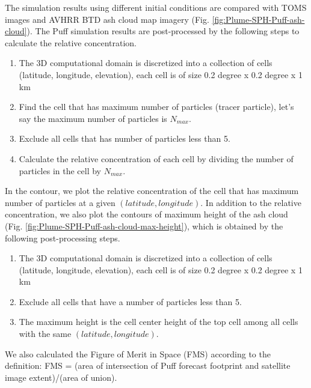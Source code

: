 \documentclass[utf8]{frontiersSCNS} %
\begin{document}
The simulation results using different initial conditions are compared with TOMS images and AVHRR BTD ash cloud map imagery (Fig. \ref{fig:Plume-SPH-Puff-ash-cloud}). The Puff simulation results are post-processed by the following steps to calculate the relative concentration.
\begin{enumerate}
\item The 3D computational domain is discretized into a collection of cells (latitude, longitude, elevation), each cell is of size 0.2 degree x 0.2 degree x 1 km
\item  Find the cell that has maximum number of particles (tracer particle), let's say the maximum number of particles is $N_{max}$.
\item Exclude all cells that has number of particles less than 5.
\item Calculate the relative concentration of each cell by dividing the number of particles in the cell by $N_{max}$.
\end{enumerate}
In the contour, we plot the relative concentration of the cell that has maximum number of particles at a given $(latitude, longitude)$.
In addition to the relative concentration, we also plot the contours of maximum height of the ash cloud (Fig. \ref{fig:Plume-SPH-Puff-ash-cloud-max-height}), which is obtained by the following post-processing steps.
\begin{enumerate}
\item The 3D computational domain is discretized into a collection of cells (latitude, longitude, elevation), each cell is of size 0.2 degree x 0.2 degree x 1 km
\item Exclude all cells that have a number of particles less than 5.
\item The maximum height is the cell center height of the top cell among all cells with the same $(latitude, longitude)$.
\end{enumerate}
We also calculated the Figure of Merit in Space (FMS) according to the definition: FMS = (area of intersection of Puff forecast footprint and satellite image extent)/(area of union).
\end{document}
